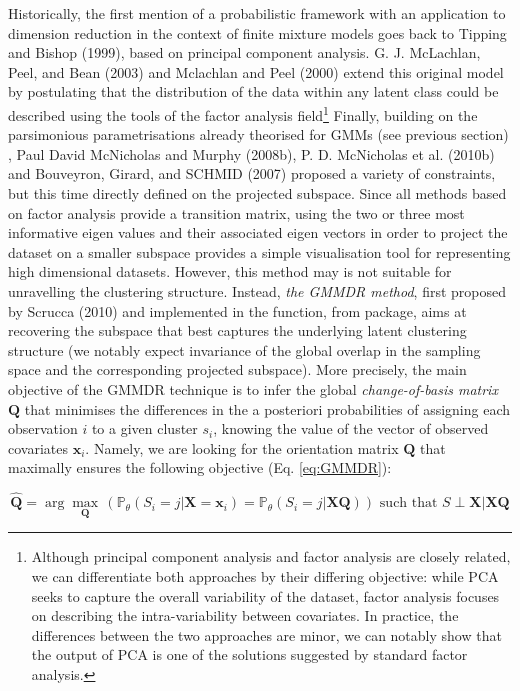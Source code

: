 Historically, the first mention of a probabilistic framework with an application to dimension reduction in the context of finite mixture models goes back to Tipping and Bishop (1999), based on principal component analysis. G. J. McLachlan, Peel, and Bean (2003) and Mclachlan and Peel (2000) extend this original model by postulating that the distribution of the data within any latent class could be described using the tools of the factor analysis field\footnote{Although principal component analysis and factor analysis are closely related, we can differentiate both approaches by their differing objective: while PCA seeks to capture the overall variability of the dataset, factor analysis focuses on describing the intra-variability between covariates. In practice, the differences between the two approaches are minor, we can notably show that the output of PCA is one of the solutions suggested by standard factor analysis.} Finally, building on the parsimonious parametrisations already theorised for GMMs (see previous section) , Paul David McNicholas and Murphy (2008b), P. D. McNicholas et al. (2010b) and Bouveyron, Girard, and SCHMID (2007) proposed a variety of constraints, but this time directly defined on the projected subspace. Since all methods based on factor analysis provide a transition matrix, using the two or three most informative eigen values and their associated eigen vectors in order to project the dataset on a smaller subspace provides a simple visualisation tool for representing high dimensional datasets.
However, this method may is not suitable for unravelling the clustering structure. Instead, \emph{the GMMDR method}, first proposed by Scrucca (2010) and implemented in the  function, from  package, aims at recovering the subspace that best captures the underlying latent clustering structure (we notably expect invariance of the global overlap in the sampling space and the corresponding projected subspace). More precisely, the main objective of the GMMDR technique is to infer the global \emph{change-of-basis matrix} \(\boldsymbol{Q}\) that minimises the differences in the a posteriori probabilities of assigning each observation \(i\) to a given cluster \(s_i\), knowing the value of the vector of observed covariates \(\boldsymbol{x}_i\). Namely, we are looking for the orientation matrix \(\boldsymbol{Q}\) that maximally ensures the following objective (Eq. \eqref{eq:GMMDR}):

\begin{equation}
 \hat{\boldsymbol{Q}} = \arg \max_{\boldsymbol{Q}} \,  \left(\mathbb{P}_{\theta} (S_i=j | \boldsymbol{X} =\boldsymbol{x}_i) = \mathbb{P}_{\theta} (S_i=j | \boldsymbol{X} \boldsymbol{Q}) \right)
\text{ such that } S \perp \boldsymbol{X} | \boldsymbol{X} \boldsymbol{Q}
    \label{eq:GMMDR}
\end{equation}

